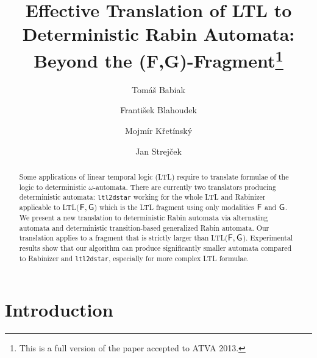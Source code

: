 \documentclass{llncs}
\begin{document}
\frontmatter



\title{Effective Translation of LTL to Deterministic Rabin Automata: Beyond
  the (F,G)-Fragment\thanks{This is a full version of the paper accepted to
    ATVA 2013.}}
\author{Tom\'{a}\v{s} Babiak \and Franti\v{s}ek Blahoudek \and Mojm\'{i}r
  K\v{r}et\'{i}nsk\'{y} \and Jan Strej\v{c}ek}



\maketitle




\begin{abstract}
  Some applications of linear temporal logic (LTL) require to translate
  formulae of the logic to deterministic $\omega$-automata. There are
  currently two translators producing deterministic automata:
  \texttt{ltl2dstar} working for the whole LTL and Rabinizer applicable to
  LTL($\mathsf{F},\mathsf{G}$) which is the LTL fragment using only modalities $\mathsf{F}$ and $\mathsf{G}$.  We
  present a new translation to deterministic Rabin automata via alternating
  automata and deterministic transition-based generalized Rabin
  automata. Our translation applies to a fragment that is strictly larger
  than LTL($\mathsf{F},\mathsf{G}$). Experimental results show that our algorithm can produce
  significantly smaller automata compared to Rabinizer and
  \texttt{ltl2dstar}, especially for more complex LTL formulae.
\end{abstract}	



\section{Introduction}
\end{document}
